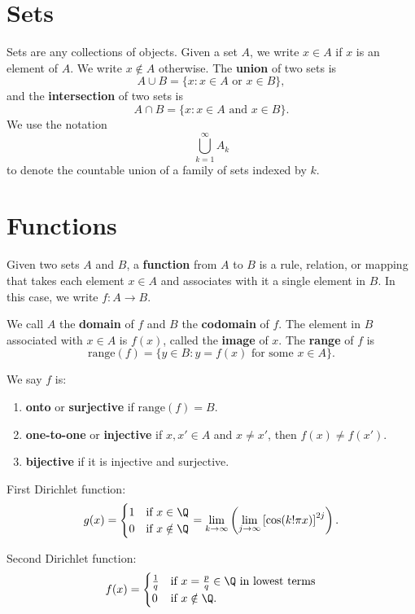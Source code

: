 \section{Sets}
Sets are any collections of objects. Given a set $A$,
we write $x \in A$ if $x$ is an element of $A$. We write
$x \notin A$ otherwise. The \textbf{union} of two sets is
\[
  A \cup B = \{x : x \in A \text{ or } x \in B\}
,\]
and the \textbf{intersection} of two sets is
\[
  A \cap B = \{x : x \in A \text{ and } x \in B\}
.\]
We use the notation
\[\bigcup_{k = 1}^{\infty} A_k\]
to denote the countable union of a family of sets
indexed by $k$.

\section{Functions}
\begin{definition}
  Given two sets $A$ and $B$, a \textbf{function}
  from $A$ to $B$ is a rule, relation, or mapping that
  takes each element $x \in A$ and associates with
  it a single element in $B$. In this case,
  we write $f : A \to B$.
\end{definition}

We call $A$ the \textbf{domain} of $f$ and $B$ the
\textbf{codomain} of $f$. The element in $B$ associated
with $x \in A$ is $f(x)$, called the \textbf{image}
of $x$. The \textbf{range} of $f$ is
\[\text{range}(f) = \{y \in B : y = f(x) \text{ for some }x \in A\}.\]

We say $f$ is:
\begin{enumerate}
  \item \textbf{onto} or \textbf{surjective} if
    $\text{range}(f) = B$.
  \item \textbf{one-to-one} or \textbf{injective} if
    $x, x' \in A$ and $x \ne x'$, then $f(x) \ne f(x')$.
  \item \textbf{bijective} if it is injective and
    surjective.
\end{enumerate}

\begin{tcolorbox}
  First Dirichlet function:
  \[
  g(x) =
  \begin{cases}
    1 & \text{if $x \in \Q$} \\
    0 & \text{if $x \notin \Q$}
  \end{cases}
  =
  \lim_{k \to \infty} \left(\lim_{j \to \infty} \left[\cos(k! \pi x)\right]^{2j}\right)
  .\]
\end{tcolorbox}

\begin{tcolorbox}
  Second Dirichlet function:
  \[
  f(x) =
  \begin{cases}
    \frac{1}{q} & \text{if $x = \frac{p}{q} \in \Q$ in lowest terms} \\
    0 & \text{if $x \notin \Q$}.
  \end{cases}
  \]
\end{tcolorbox}

